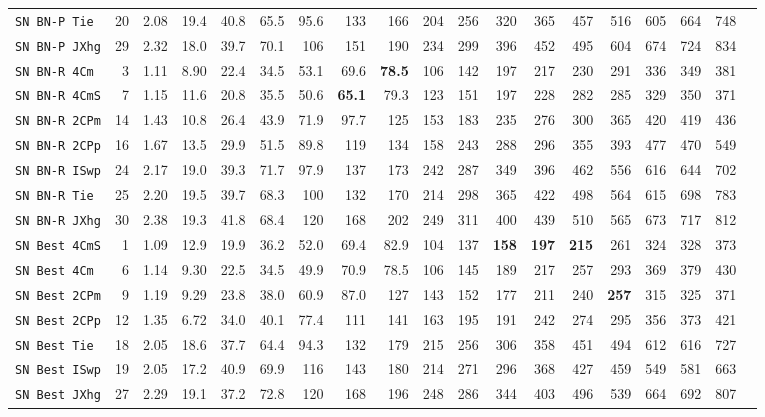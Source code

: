 \begin{tabular}{l | r @{~~} r | r@{~~}r@{~~}r@{~~}r@{~~}r@{~~}r@{~~}r@{~~}r@{~~}r@{~~}r@{~~}r@{~~}r@{~~}r@{~~}r@{~~}r@{~~}r|}
\verb+SN BN-P Tie + & 20 & 2.08 & 19.4&40.8&65.5&95.6&133&166&204&256&320&365&457&516&605&664&748\\
\verb+SN BN-P JXhg+ & 29 & 2.32 & 18.0&39.7&70.1&106&151&190&234&299&396&452&495&604&674&724&834\smallskip \\
\verb+SN BN-R 4Cm + & 3 & 1.11 & 8.90&22.4&34.5&53.1&69.6&\textbf{78.5}&106&142&197&217&230&291&336&349&381\\
\verb+SN BN-R 4CmS+ & 7 & 1.15 & 11.6&20.8&35.5&50.6&\textbf{65.1}&79.3&123&151&197&228&282&285&329&350&371\\
\verb+SN BN-R 2CPm+ & 14 & 1.43 & 10.8&26.4&43.9&71.9&97.7&125&153&183&235&276&300&365&420&419&436\\
\verb+SN BN-R 2CPp+ & 16 & 1.67 & 13.5&29.9&51.5&89.8&119&134&158&243&288&296&355&393&477&470&549\\
\verb+SN BN-R ISwp+ & 24 & 2.17 & 19.0&39.3&71.7&97.9&137&173&242&287&349&396&462&556&616&644&702\\
\verb+SN BN-R Tie + & 25 & 2.20 & 19.5&39.7&68.3&100&132&170&214&298&365&422&498&564&615&698&783\\
\verb+SN BN-R JXhg+ & 30 & 2.38 & 19.3&41.8&68.4&120&168&202&249&311&400&439&510&565&673&717&812\smallskip \\
\verb+SN Best 4CmS+ & 1 & 1.09 & 12.9&19.9&36.2&52.0&69.4&82.9&104&137&\textbf{158}&\textbf{197}&\textbf{215}&261&324&328&373\\
\verb+SN Best 4Cm + & 6 & 1.14 & 9.30&22.5&34.5&49.9&70.9&78.5&106&145&189&217&257&293&369&379&430\\
\verb+SN Best 2CPm+ & 9 & 1.19 & 9.29&23.8&38.0&60.9&87.0&127&143&152&177&211&240&\textbf{257}&315&325&371\\
\verb+SN Best 2CPp+ & 12 & 1.35 & 6.72&34.0&40.1&77.4&111&141&163&195&191&242&274&295&356&373&421\\
\verb+SN Best Tie + & 18 & 2.05 & 18.6&37.7&64.4&94.3&132&179&215&256&306&358&451&494&612&616&727\\
\verb+SN Best ISwp+ & 19 & 2.05 & 17.2&40.9&69.9&116&143&180&214&271&296&368&427&459&549&581&663\\
\verb+SN Best JXhg+ & 27 & 2.29 & 19.1&37.2&72.8&120&168&196&248&286&344&403&496&539&664&692&807\\
\end{tabular}
